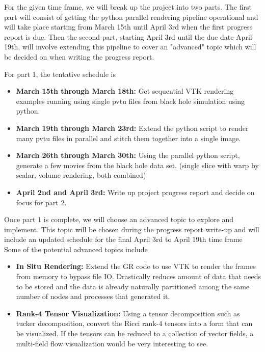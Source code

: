 For the given time frame, we will break up the project into two parts. The first part will consist of getting the python parallel rendering pipeline operational and will take place starting from March 15th until April 3rd when the first progress report is due. Then the second part, starting April 3rd until the due date April 19th, will involve extending this pipeline to cover an "advanced" topic which will be decided on when writing the progress report.

For part 1, the tentative schedule is

\begin{itemize}
	\item \textbf{March 15th through March 18th:} Get sequential VTK rendering examples running using single pvtu files from black hole simulation using python.
	\item \textbf{March 19th through March 23rd:} Extend the python script to render many pvtu files in parallel and stitch them together into a single image.
	\item \textbf{March 26th through March 30th:} Using the parallel python script, generate a few movies from the black hole data set. (single slice with warp by scalar, volume rendering, both combined)
	\item \textbf{April 2nd and April 3rd:} Write up project progress report and decide on focus for part 2.
\end{itemize}

Once part 1 is complete, we will choose an advanced topic to explore and implement. This topic will be chosen during the progress report write-up and will include an updated schedule for the final April 3rd to April 19th time frame Some of the potential advanced topics include

\begin{itemize}
	\item \textbf{In Situ Rendering:} Extend the GR code to use VTK to render the frames from memory to bypass file IO. Drastically reduces amount of data that needs to be stored and the data is already naturally partitioned among the same number of nodes and processes that generated it.
	\item \textbf{Rank-4 Tensor Visualization:} Using a tensor decomposition such as tucker decomposition, convert the Ricci rank-4 tensors into a form that can be visualized. If the tensors can be reduced to a collection of vector fields, a multi-field flow visualization would be very interesting to see.
\end{itemize}